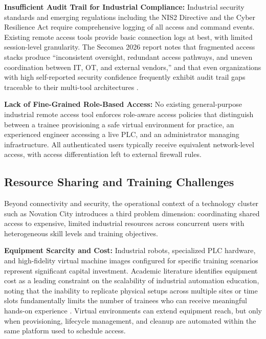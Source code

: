 \textbf{Insufficient Audit Trail for Industrial Compliance:} Industrial security
standards and emerging regulations including the NIS2 Directive and the Cyber
Resilience Act require comprehensive logging of all access
and command events. Existing remote access tools provide basic connection logs
at best, with limited session-level granularity. The Secomea 2026 report
notes that fragmented access stacks produce ``inconsistent oversight, redundant
access pathways, and uneven coordination between IT, OT, and external vendors,''
and that even organizations with high self-reported security confidence frequently
exhibit audit trail gaps traceable to their multi-tool architectures
{\footnotesize\cite{secomea-state-2026}}.

\textbf{Lack of Fine-Grained Role-Based Access:} No existing general-purpose
industrial remote access tool enforces role-aware access policies that
distinguish between a trainee provisioning a safe virtual environment for
practice, an experienced engineer accessing a live PLC, and an administrator
managing infrastructure. All authenticated users typically receive equivalent
network-level access, with access differentiation left to external firewall
rules.

\subsection{Resource Sharing and Training Challenges}

Beyond connectivity and security, the operational context of a technology
cluster such as Novation City introduces a third problem dimension: coordinating
shared access to expensive, limited industrial resources across concurrent users
with heterogeneous skill levels and training objectives.

\textbf{Equipment Scarcity and Cost:} Industrial robots, specialized PLC
hardware, and high-fidelity virtual machine images configured for specific
training scenarios represent significant capital investment. Academic literature
identifies equipment cost as a leading constraint on the scalability of
industrial automation education, noting that the inability to replicate physical
setups across multiple sites or time slots fundamentally limits the number
of trainees who can receive meaningful hands-on experience
{\footnotesize\cite{plos-plc-lab-2025}}. Virtual environments can extend
equipment reach, but only when provisioning, lifecycle management, and cleanup
are automated within the same platform used to schedule access.

